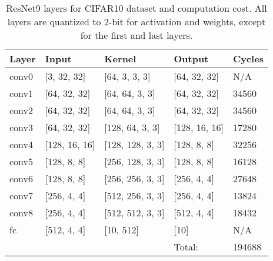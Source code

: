 \documentclass[sigconf]{acmart}
\begin{document}
\begin{table}[]
\centering

    \caption{ResNet9 layers for CIFAR10 dataset and computation cost.  All layers are quantized to 2-bit for activation and weights, except for the first and last layers.}
    \begin{tabular}{lll|l|l|}
    \hline
    \multicolumn{1}{|l|}{Layer} & \multicolumn{1}{l|}{Input}                & Kernel               & Output               & Cycles \\ \hline\hline
    \multicolumn{1}{|l|}{conv0} & \multicolumn{1}{l|}{{[}3, 32, 32{]}}   & {[}64, 3, 3, 3{]}    & {[}64, 32, 32{]}  & N/A    \\ \hline
    \multicolumn{1}{|l|}{conv1} & \multicolumn{1}{l|}{{[}64, 32, 32{]}}  & {[}64, 64, 3, 3{]}   & {[}64, 32, 32{]}  & 34560  \\ \hline
    \multicolumn{1}{|l|}{conv2} & \multicolumn{1}{l|}{{[}64, 32, 32{]}}  & {[}64, 64, 3, 3{]}   & {[}64, 32, 32{]}  & 34560  \\ \hline
    \multicolumn{1}{|l|}{conv3} & \multicolumn{1}{l|}{{[}64, 32, 32{]}}  & {[}128, 64, 3, 3{]}  & {[}128, 16, 16{]} & 17280  \\ \hline
    \multicolumn{1}{|l|}{conv4} & \multicolumn{1}{l|}{{[}128, 16, 16{]}} & {[}128, 128, 3, 3{]} & {[}128, 8, 8{]}   & 32256  \\ \hline
    \multicolumn{1}{|l|}{conv5} & \multicolumn{1}{l|}{{[}128, 8, 8{]}}   & {[}256, 128, 3, 3{]} & {[}128, 8, 8{]}   & 16128  \\ \hline
    \multicolumn{1}{|l|}{conv6} & \multicolumn{1}{l|}{{[}128, 8, 8{]}}   & {[}256, 256, 3, 3{]} & {[}256, 4, 4{]}   & 27648  \\ \hline
    \multicolumn{1}{|l|}{conv7} & \multicolumn{1}{l|}{{[}256, 4, 4{]}}   & {[}512, 256, 3, 3{]} & {[}256, 4, 4{]}   & 13824  \\ \hline
    \multicolumn{1}{|l|}{conv8} & \multicolumn{1}{l|}{{[}256, 4, 4{]}}   & {[}512, 512, 3, 3{]} & {[}512, 4, 4{]}   & 18432  \\ \hline
    \multicolumn{1}{|l|}{fc}    & \multicolumn{1}{l|}{{[}512, 4, 4{]}}   & {[}10, 512{]}        & {[}10{]}           & N/A    \\ \hline
                                &                                           &                      & Total:               & 194688 \\ \cline{4-5} 
    \end{tabular}
    \label{tab:resnet9_perf}
\vspace{-0.5cm}
\end{table}
\end{document}

